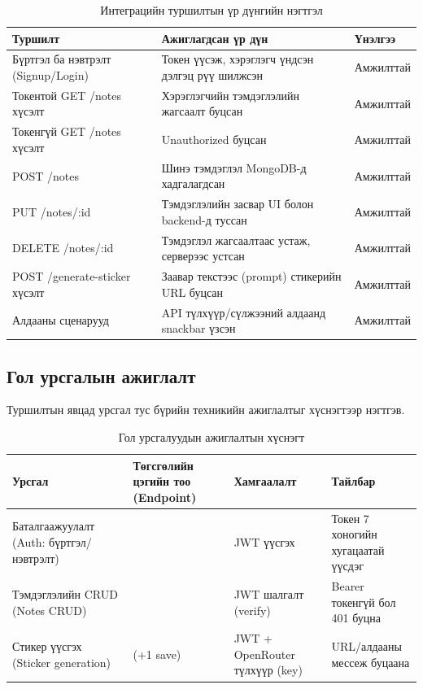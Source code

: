 \begin{table}[H]
\centering
\caption{Интеграцийн туршилтын үр дүнгийн нэгтгэл}
\label{tab:test_result_summary}
\begin{tabular}{>{\raggedright\arraybackslash}p{4.4cm}>{\raggedright\arraybackslash}p{7.2cm}>{\raggedright\arraybackslash}p{2.0cm}}
\toprule
\textbf{Туршилт} & \textbf{Ажиглагдсан үр дүн} & \textbf{Үнэлгээ} \\
\midrule
Бүртгэл ба нэвтрэлт (Signup/Login) & Токен үүсэж, хэрэглэгч үндсэн дэлгэц рүү шилжсэн & Амжилттай \\
Токентой GET /notes хүсэлт & Хэрэглэгчийн тэмдэглэлийн жагсаалт буцсан & Амжилттай \\
Токенгүй GET /notes хүсэлт & 401 Unauthorized буцсан & Амжилттай \\
POST /notes & Шинэ тэмдэглэл MongoDB-д хадгалагдсан & Амжилттай \\
PUT /notes/:id & Тэмдэглэлийн засвар UI болон backend-д туссан & Амжилттай \\
DELETE /notes/:id & Тэмдэглэл жагсаалтаас устаж, серверээс устсан & Амжилттай \\
POST /generate-sticker хүсэлт & Заавар текстээс (prompt) стикерийн URL буцсан & Амжилттай \\
Алдааны сценарууд & API түлхүүр/сүлжээний алдаанд snackbar үзсэн & Амжилттай \\
\bottomrule
\end{tabular}
\end{table}

\subsection{Гол урсгалын ажиглалт}
\label{subsec:backend_flow_metrics}

Туршилтын явцад урсгал тус бүрийн техникийн ажиглалтыг  хүснэгтээр нэгтгэв.

\begin{table}[H]
\centering
\caption{Гол урсгалуудын ажиглалтын хүснэгт}
\label{tab:flow_metrics}
\begin{tabular}{>{\raggedright\arraybackslash}p{3.9cm}>{\raggedright\arraybackslash}p{2.4cm}>{\raggedright\arraybackslash}p{2.4cm}>{\raggedright\arraybackslash}p{3.8cm}}
\toprule
\textbf{Урсгал} & \textbf{Төгсгөлийн цэгийн тоо (Endpoint)} & \textbf{Хамгаалалт} & \textbf{Тайлбар} \\
\midrule
Баталгаажуулалт (Auth: бүртгэл/нэвтрэлт) & 2 & JWT үүсгэх & Токен 7 хоногийн хугацаатай үүсдэг \\
Тэмдэглэлийн CRUD (Notes CRUD) & 5 & JWT шалгалт (verify) & Bearer токенгүй бол 401 буцна \\
Стикер үүсгэх (Sticker generation) & 1 (+1 save) & JWT + OpenRouter түлхүүр (key) & URL/алдааны мессеж буцаана \\
\bottomrule
\end{tabular}
\end{table}

